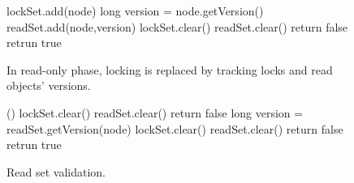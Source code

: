  

\begin{figure}
\begin{algorithmic}[1]{}
		{\ttfamily
		\State lockSet.add(node) \label{code:lockedSet:add}
			\State long version = node.getVersion() \label{code:track:getVersion}
			\State readSet.add(node,version)  
				\State lockSet.clear()
				\State readSet.clear()
				\State return false \label{code:track:returnFalse}
			\EndIf
			\State retrun true
		\EndFunction
		}
\end{algorithmic}
\caption{ In read-only phase, locking is replaced by 
tracking locks and read
objects' versions.
\label{figure::track}}
\end{figure}

\begin{figure}
\begin{algorithmic}[1]{}
		{\ttfamily
		()
				\State lockSet.clear()
				\State readSet.clear()
				\State return false
				\EndIf
			\EndIf
			\State long version = readSet.getVersion(node)
				\State lockSet.clear()
				\State readSet.clear()
				\State return false
			\EndIf
		\EndFor
		\State retrun true
		\EndFunction
		}
\end{algorithmic}
\caption{Read set validation.\label{figure::validate}}
\end{figure}


